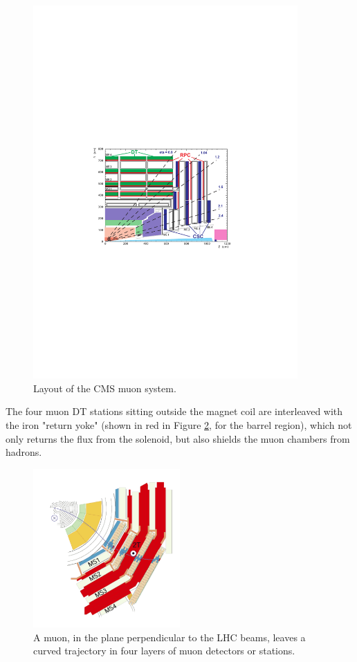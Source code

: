     \begin{figure}[h]
 	\centering
 	\includegraphics[width=0.9\textwidth]{figures/CMS_muon_system.pdf}
 	\singlespace
 	\caption{Layout of the CMS muon system.}
 	\label{fig:cmsmuonsys}
	\end{figure}

The four muon DT stations sitting outside the magnet coil are interleaved with the
iron "return yoke" (shown in red in Figure \ref{fig:cmsmuchambers}, for the barrel region), which not only returns the flux from the solenoid, but also shields the muon chambers from hadrons. 

    \begin{figure}[h]
 	\centering
 	\includegraphics[width=0.5\textwidth]{figures/MuStations.png}
 	\singlespace
 	\caption{A muon, in the plane perpendicular to the LHC beams, leaves a curved trajectory in four layers of muon detectors or stations.}
 	\label{fig:cmsmuchambers}
	\end{figure}

